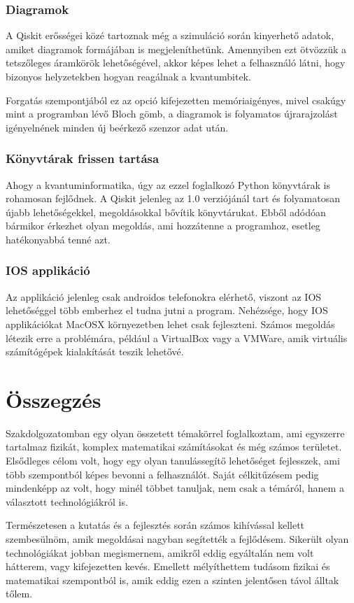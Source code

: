 \documentclass[
]{thesis-ekf}
\theoremstyle{definition}
\theoremstyle{remark}
\begin{document}
\subsection{Diagramok}
A Qiskit erősségei közé tartoznak még a szimuláció során kinyerhető adatok, amiket diagramok formájában is megjeleníthetünk. Amennyiben ezt ötvözzük a tetszőleges áramkörök lehetőségével, akkor képes lehet a felhasználó látni, hogy bizonyos helyzetekben hogyan reagálnak a kvantumbitek.

Forgatás szempontjából ez az opció kifejezetten memóriaigényes, mivel csakúgy mint a programban lévő Bloch gömb, a diagramok is folyamatos újrarajzolást igényelnének minden új beérkező szenzor adat után.

\subsection{Könyvtárak frissen tartása}
Ahogy a kvantuminformatika, úgy az ezzel foglalkozó Python könyvtárak is rohamosan fejlődnek. A Qiskit jelenleg az 1.0 verziójánál tart és folyamatosan újabb lehetőségekkel, megoldásokkal bővítik könyvtárukat. Ebből adódóan bármikor érkezhet olyan megoldás, ami hozzátenne a programhoz, esetleg hatékonyabbá tenné azt.

\subsection{IOS applikáció}
Az applikáció jelenleg csak androidos telefonokra elérhető, viszont az IOS lehetőséggel több emberhez el tudna jutni a program. Nehézsége, hogy IOS applikációkat MacOSX környezetben lehet csak fejleszteni. Számos megoldás létezik erre a problémára, például a VirtualBox vagy a VMWare, amik virtuális számítógépek kialakítását teszik lehetővé.

\chapter*{Összegzés}
Szakdolgozatomban egy olyan összetett témakörrel foglalkoztam, ami egyszerre tartalmaz fizikát, komplex matematikai számításokat és még számos területet. Elsődleges célom volt, hogy egy olyan tanulássegítő lehetőséget fejlesszek, ami több szempontból képes bevonni a felhasználót. Saját célkitűzésem pedig mindenképp az volt, hogy minél többet tanuljak, nem csak a témáról, hanem a választott technológiákról is.

Természetesen a kutatás és a fejlesztés során számos kihívással kellett szembesülnöm, amik megoldásai nagyban segítették a fejlődésem. Sikerült olyan technológiákat jobban megismernem, amikről eddig egyáltalán nem volt hátterem, vagy kifejezetten kevés. Emellett mélyíthettem tudásom fizikai és matematikai szempontból is, amik eddig ezen a szinten jelentősen távol álltak tőlem.
\end{document}
